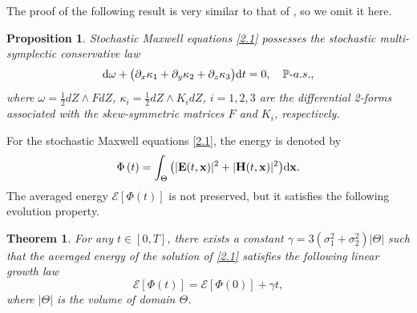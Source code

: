 \documentclass[preprint,12pt]{article}
\newtheorem{theorem}{Theorem}[section]
\newtheorem{prop}{Proposition}[section]
\numberwithin{figure}{section}
\numberwithin{table}{section}
\numberwithin{equation}{section}
\begin{document}
The proof of the following result is very similar to that of \cite[Theorem 3.2]{RefCHJ2023}, so we omit it here.
\begin{prop}
Stochastic Maxwell equations \eqref{2.1} possesses the stochastic multi-symplectic conservative law
\begin{equation*}
{\rm d}\omega+\big(\partial_{x}\kappa_{1}+\partial_{y}\kappa_{2}+\partial_{z}\kappa_{3}\big){\rm d}t=0,\quad {\mathbb P}\text{-}a.s.,
\end{equation*}
where $\omega=\frac{1}{2}dZ\wedge FdZ$, $\kappa_{i}=\frac{1}{2}dZ\wedge K_{i}dZ$, $i=1,2,3$ are the differential 2-forms associated with the skew-symmetric matrices $F$ and $K_{i}$, respectively.
\end{prop}

For the stochastic Maxwell equations \eqref{2.1}, the energy is denoted by 
\begin{equation}
\Phi \left( t\right) = \int_\Theta\big(|{\bf E}(t,{\bf x})|^2+|{\bf H}(t,{\bf x})|^2\big){\rm d}{\bf x}. 
\end{equation}
The averaged energy $\mathcal{E}\left[\Phi \left( t\right)\right]$ is not preserved, but it satisfies the following evolution property.
\begin{theorem}\label{theorem2.3}
For any $t\in[0,T]$, there exists a constant $\gamma=3(\sigma_1^2+\sigma_2^2)|\Theta|$ such that the averaged energy of the solution of \eqref{2.1} satisfies the following linear growth law
		$$\mathcal{E}\left[\Phi \left(t\right)\right]=\mathcal{E}\left[\Phi \left(0\right)\right]+\gamma t,$$
where $|\Theta|$ is the volume of domain $\Theta$.
\end{theorem}
\end{document}
